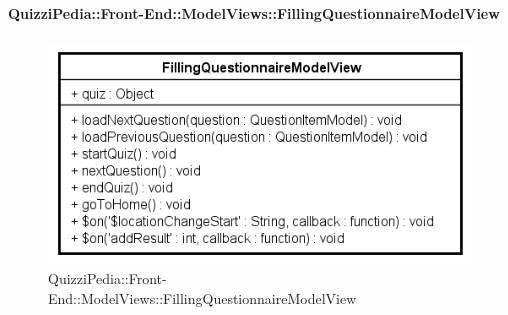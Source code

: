 	\paragraph[QuizziPedia::Front-End::ModelViews\\::FillingQuestionnaireModelView]{QuizziPedia::Front-End::ModelViews::FillingQuestionnaireModelView}
	
	\label{QuizziPedia::Front-End::ModelViews::FillingQuestionnaireModelView}
	
	\begin{figure}[ht]
		\centering
		\includegraphics[scale=0.8,keepaspectratio]{UML/Classi/Front-End/QuizziPedia_Front-end_ModelView_FillingQuestionnaireModelView.png}
		\caption{QuizziPedia::Front-End::ModelViews::FillingQuestionnaireModelView}
	\end{figure} \FloatBarrier
	
